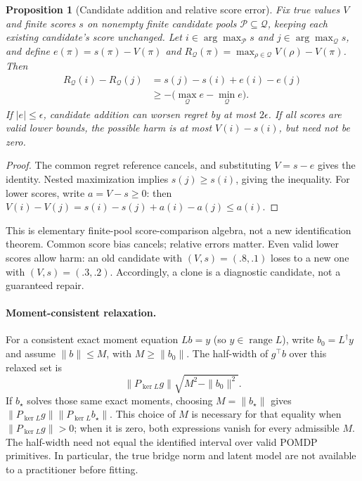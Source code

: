 \documentclass[11pt]{article}
\newtheorem{proposition}{Proposition}
\begin{document}
\begin{proposition}[Candidate addition and relative score error]
Fix true values $V$ and finite scores $s$ on nonempty finite candidate pools
$\mathcal P\subseteq\mathcal Q$, keeping each existing candidate's score
unchanged. Let $i\in\arg\max_{\mathcal P}s$ and
$j\in\arg\max_{\mathcal Q}s$, and define
$e(\pi)=s(\pi)-V(\pi)$ and
$R_{\mathcal Q}(\pi)=\max_{\rho\in\mathcal Q}V(\rho)-V(\pi)$.
Then
\begin{equation}
\begin{aligned}
R_{\mathcal Q}(i)-R_{\mathcal Q}(j)
 &=s(j)-s(i)+e(i)-e(j)\\
 &\ge-\bigl(\max_{\mathcal Q}e-\min_{\mathcal Q}e\bigr).
\end{aligned}\label{eq:addition}
\end{equation}
If $|e|\le\epsilon$, candidate addition can worsen regret by at most
$2\epsilon$. If all scores are valid lower bounds, the possible harm is at
most $V(i)-s(i)$, but need not be zero.
\end{proposition}
\begin{proof}
The common regret reference cancels, and substituting $V=s-e$ gives the
identity. Nested maximization implies $s(j)\ge s(i)$, giving the inequality.
For lower scores, write $a=V-s\ge0$: then
$V(i)-V(j)=s(i)-s(j)+a(i)-a(j)\le a(i)$.
\end{proof}
This is elementary finite-pool score-comparison algebra, not a new
identification theorem. Common score bias cancels; relative errors matter.
Even valid lower scores allow harm: an old candidate with
$(V,s)=(.8,.1)$ loses to a new one with $(V,s)=(.3,.2)$.
Accordingly, a clone is a diagnostic candidate, not a guaranteed repair.

\paragraph{Moment-consistent relaxation.}
For a consistent exact moment equation $Lb=y$ (so $y\in\operatorname{range}L$),
write $b_0=L^\dagger y$ and assume
$\|b\|\le M$, with $M\ge\|b_0\|$. The half-width of $g^\top b$ over this
relaxed set is
\begin{equation}
 \|P_{\ker L}g\|\sqrt{M^2-\|b_0\|^2}.
\end{equation}
If $b_\star$ solves those same exact moments, choosing $M=\|b_\star\|$
gives $\|P_{\ker L}g\|\|P_{\ker L}b_\star\|$. This choice of $M$ is
necessary for that equality when $\|P_{\ker L}g\|>0$; when it is zero,
both expressions vanish for every admissible $M$. The half-width need not
equal the identified interval over valid POMDP primitives. In particular, the
true bridge norm and latent model are not available to a practitioner before
fitting.
\end{document}
